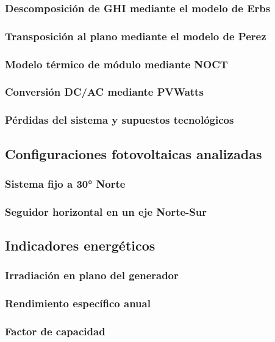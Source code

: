 \documentclass[11pt,a4paper]{article}
\begin{document}
\subsubsection{Descomposición de GHI mediante el modelo de Erbs}
\subsubsection{Transposición al plano mediante el modelo de Perez}
\subsubsection{Modelo térmico de módulo mediante NOCT}
\subsubsection{Conversión DC/AC mediante PVWatts}
\subsubsection{Pérdidas del sistema y supuestos tecnológicos}

\subsection{Configuraciones fotovoltaicas analizadas}
\subsubsection{Sistema fijo a 30° Norte}
\subsubsection{Seguidor horizontal en un eje Norte-Sur}

\subsection{Indicadores energéticos}
\subsubsection{Irradiación en plano del generador}
\subsubsection{Rendimiento específico anual}
\subsubsection{Factor de capacidad}
\end{document}
